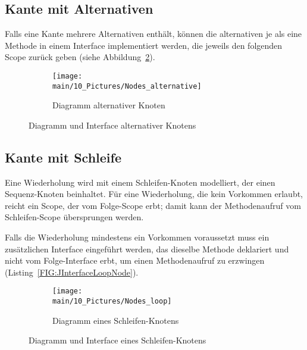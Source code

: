 \documentclass[../InterneDSLs.tex]{subfiles}
\begin{document}
\subsection{Kante mit Alternativen}
Falls eine Kante mehrere Alternativen enthält, können die alternativen je als eine Methode in einem Interface implementiert werden, die jeweils den folgenden Scope zurück geben (siehe Abbildung~\ref{FIG:AlternativeNode}).
\begin{figure}[ht]
\centering
  \begin{subfigure}[c]{0.49\textwidth}
    \texttt{[image: \\main/10\_Pictures/Nodes\_alternative]}
    \caption{Diagramm alternativer Knoten}
    \label{FIG:DiagramAlternativeNode}
  \end{subfigure}
  \begin{subfigure}[c]{0.49\textwidth}
    
  \end{subfigure}
  \caption{Diagramm und Interface alternativer Knotens}
  \label{FIG:AlternativeNode}
\end{figure}

\subsection{Kante mit Schleife}
Eine Wiederholung wird mit einem Schleifen-Knoten modelliert, der einen Sequenz-Knoten beinhaltet. Für eine Wiederholung, die kein Vorkommen erlaubt, reicht ein Scope, der vom Folge-Scope erbt; damit kann der Methodenaufruf vom Schleifen-Scope übersprungen werden.

Falls die Wiederholung mindestens ein Vorkommen voraussetzt muss ein zusätzlichen Interface eingeführt werden, das dieselbe Methode deklariert und nicht vom Folge-Interface erbt, um einen Methodenaufruf zu erzwingen (Listing~\ref{FIG:JInterfaceLoopNode}).
\begin{figure}[ht]
\centering
  \begin{subfigure}[c]{0.49\textwidth}
    \texttt{[image: \\main/10\_Pictures/Nodes\_loop]}
    \caption{Diagramm eines Schleifen-Knotens}
    \label{FIG:DiagramLoopNode}
  \end{subfigure}
  \begin{subfigure}[c]{0.49\textwidth}
    
  \end{subfigure}
  \caption{Diagramm und Interface eines Schleifen-Knotens}
  \label{FIG:LoopNode}
\end{figure}
\end{document}
